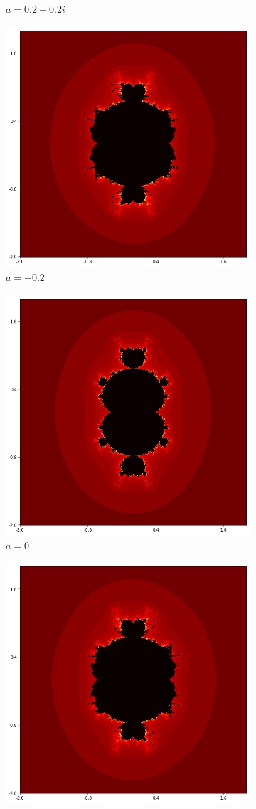 \documentclass{amsart}
\theoremstyle{definition}
\theoremstyle{remark}
\numberwithin{equation}{section}
\begin{document}
\begin{figure}[h]
\begin{subfigure}{.32\textwidth}
  \caption{$a=0.2+0.2i$}
\end{subfigure}
\begin{subfigure}{.32\textwidth}
  \centering
  \includegraphics[width=0.7\linewidth]{ShiftLocus3a4.png}
  \caption{$a=-0.2$}
\end{subfigure}
\begin{subfigure}{.32\textwidth}\label{fig:ShiftLocus3a5}
  \centering
  \includegraphics[width=0.7\linewidth]{ShiftLocus3a5.png}
  \caption{$a=0$}
\end{subfigure}%
\begin{subfigure}{.32\textwidth}
  \centering
  \includegraphics[width=0.7\linewidth]{ShiftLocus3a6.png}

\end{subfigure}
\end{figure}
\end{document}
